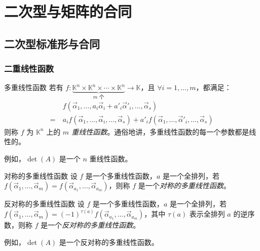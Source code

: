 
\chapter{二次型与矩阵的合同}

\section{二次型标准形与合同}

\subsection{二重线性函数}

\begin{definition}{多重线性函数}
	若有 $f: \underset{\text{$m$ 个}}{\underbrace{\mathbb K^n \times \mathbb K^n \times \cdots \times \mathbb K^n}} \to \mathbb K$，且 $\forall i = 1, \ldots, m$，都满足：
	$$
	\begin{aligned}&
		f(\vec \alpha_1, \ldots, a_i \vec \alpha_i + a'_i \vec \alpha'_i, \ldots, \vec \alpha_s)
		\\=~&
		a_i f(\vec \alpha_1, \ldots, \vec \alpha_i, \ldots, \vec \alpha_s) + a'_i f(\vec \alpha_1, \ldots, \vec \alpha'_i, \ldots, \vec \alpha_s)
	\end{aligned}
	$$
	则称 $f$ 为 $\mathbb K^n$ 上的 \emph{$m$ 重线性函数}。通俗地讲，多重线性函数的每一个参数都是线性的。
\end{definition}

例如，$\det(A)$ 是一个 $n$ 重线性函数。

\begin{definition}{对称的多重线性函数}
	设 $f$ 是一个多重线性函数，$a$ 是一个全排列，若 $f(\vec \alpha_1, \ldots, \vec \alpha_m) = f(\vec \alpha_{a_1}, \ldots, \vec \alpha_{a_m})$，则称 $f$ 是一个\emph{对称的多重线性函数}。
\end{definition}

\begin{definition}{反对称的多重线性函数}
	设 $f$ 是一个多重线性函数，$a$ 是一个全排列，若 $f(\vec \alpha_1, \ldots, \vec \alpha_m) = (-1)^{\tau(a)} f(\vec \alpha_{a_1}, \ldots, \vec \alpha_{a_m})$，其中 $\tau(a)$ 表示全排列 $a$ 的逆序数，则称 $f$ 是一个\emph{反对称的多重线性函数}。
\end{definition}

例如，$\det(A)$ 是一个反对称的多重线性函数。

